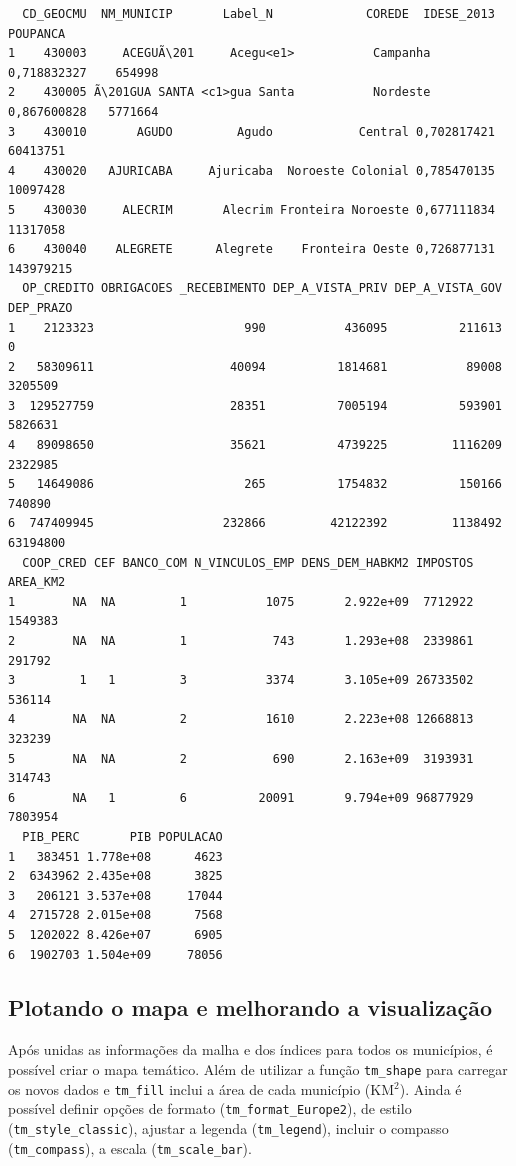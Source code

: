 \documentclass[12pt,brazil,oneside]{book}
\begin{document}
\begin{verbatim}
  CD_GEOCMU  NM_MUNICIP       Label_N             COREDE  IDESE_2013  POUPANCA
1    430003     ACEGUÃ\201     Acegu<e1>           Campanha 0,718832327    654998
2    430005 Ã\201GUA SANTA <c1>gua Santa           Nordeste 0,867600828   5771664
3    430010       AGUDO         Agudo            Central 0,702817421  60413751
4    430020   AJURICABA     Ajuricaba  Noroeste Colonial 0,785470135  10097428
5    430030     ALECRIM       Alecrim Fronteira Noroeste 0,677111834  11317058
6    430040    ALEGRETE      Alegrete    Fronteira Oeste 0,726877131 143979215
  OP_CREDITO OBRIGACOES _RECEBIMENTO DEP_A_VISTA_PRIV DEP_A_VISTA_GOV DEP_PRAZO
1    2123323                     990           436095          211613         0
2   58309611                   40094          1814681           89008   3205509
3  129527759                   28351          7005194          593901   5826631
4   89098650                   35621          4739225         1116209   2322985
5   14649086                     265          1754832          150166    740890
6  747409945                  232866         42122392         1138492  63194800
  COOP_CRED CEF BANCO_COM N_VINCULOS_EMP DENS_DEM_HABKM2 IMPOSTOS AREA_KM2
1        NA  NA         1           1075       2.922e+09  7712922  1549383
2        NA  NA         1            743       1.293e+08  2339861   291792
3         1   1         3           3374       3.105e+09 26733502   536114
4        NA  NA         2           1610       2.223e+08 12668813   323239
5        NA  NA         2            690       2.163e+09  3193931   314743
6        NA   1         6          20091       9.794e+09 96877929  7803954
  PIB_PERC       PIB POPULACAO
1   383451 1.778e+08      4623
2  6343962 2.435e+08      3825
3   206121 3.537e+08     17044
4  2715728 2.015e+08      7568
5  1202022 8.426e+07      6905
6  1902703 1.504e+09     78056
\end{verbatim}

\hypertarget{plotando-o-mapa-e-melhorando-a-visualizacao}{%
\subsection{Plotando o mapa e melhorando a visualização}\label{plotando-o-mapa-e-melhorando-a-visualizacao}}

Após unidas as informações da malha e dos índices para todos os municípios, é possível criar o mapa temático. Além de utilizar a função \texttt{tm\_shape} para carregar os novos dados e \texttt{tm\_fill} inclui a área de cada município (KM\(^2\)). Ainda é possível definir opções de formato (\texttt{tm\_format\_Europe2}), de estilo (\texttt{tm\_style\_classic}), ajustar a legenda (\texttt{tm\_legend}), incluir o compasso (\texttt{tm\_compass}), a escala (\texttt{tm\_scale\_bar}).
\end{document}

